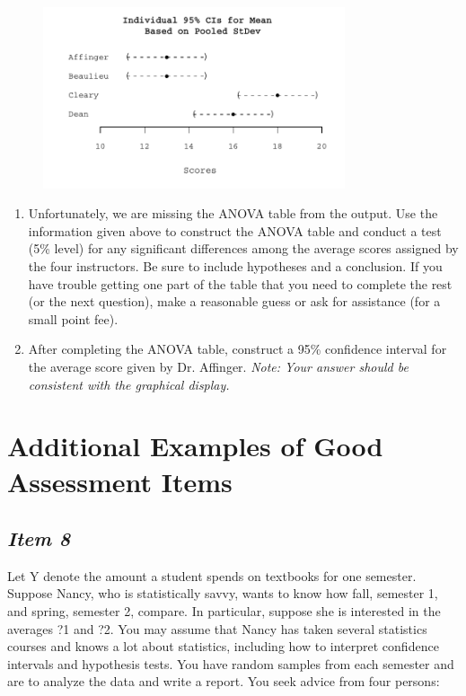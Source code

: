 \documentclass[twoside,openany]{tufte-book}
\begin{document}
\begin{figure}
\includegraphics[width=3.5in]{Item7_R.pdf}
\end{figure}
\newpage

\renewcommand{\labelenumi}{\arabic{enumi}.}
\begin{enumerate}[leftmargin=1cm, itemsep=.2em]
\item Unfortunately, we are missing the ANOVA table from the output. Use the information given above to construct the ANOVA table and conduct a test (5\% level) for any significant differences among the average scores assigned by the four instructors.  Be sure to include hypotheses and a conclusion.   If you have trouble getting one part of the table that you need to complete the rest (or the next question), make a reasonable guess or ask for assistance (for a small point fee). 
\item After completing the ANOVA table, construct a 95\% confidence interval for the average score given by Dr. Affinger. \textit{Note: Your answer should be consistent with the graphical display.}
\end{enumerate}


\section{\textbf{Additional Examples of Good Assessment Items}}

\subsection{\textbf{\textit{Item 8}}}
Let Y denote the amount a student spends on textbooks for one semester. Suppose Nancy, who is statistically savvy, wants to know how fall, semester 1, and spring, semester 2, compare.  In particular, suppose she is interested in the averages ?1 and ?2.  You may assume that Nancy has taken several statistics courses and knows a lot about statistics, including how to interpret confidence intervals and hypothesis tests.  You have random samples from each semester and are to analyze the data and write a report.  You seek advice from four persons:
\end{document}
